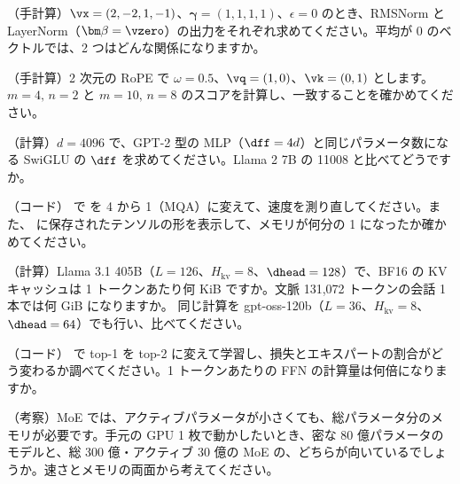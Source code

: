 \begin{exercises}
\item （手計算）$\vx=(2,-2,1,-1)$、$\bm\gamma=(1,1,1,1)$、$\epsilon=0$ のとき、RMSNorm と LayerNorm（$\bm\beta=\vzero$）の出力をそれぞれ求めてください。平均が 0 のベクトルでは、2 つはどんな関係になりますか。
\item （手計算）2 次元の RoPE で $\omega=0.5$、$\vq=(1,0)$、$\vk=(0,1)$ とします。$m=4,\,n=2$ と $m=10,\,n=8$ のスコアを計算し、一致することを確かめてください。
\item （計算）$d=4096$ で、GPT-2 型の MLP（$\dff=4d$）と同じパラメータ数になる SwiGLU の $\dff$ を求めてください。Llama 2 7B の 11008 と比べてどうですか。
\item （コード） で  を 4 から 1（MQA）に変えて、速度を測り直してください。また、 に保存されたテンソルの形を表示して、メモリが何分の 1 になったか確かめてください。
\item （計算）Llama 3.1 405B（$L=126$、$H_{\mathrm{kv}}=8$、$\dhead=128$）で、BF16 の KV キャッシュは 1 トークンあたり何 KiB ですか。文脈 131,072 トークンの会話 1 本では何 GiB になりますか。 同じ計算を gpt-oss-120b（$L=36$、$H_{\mathrm{kv}}=8$、$\dhead=64$）でも行い、比べてください。
\item （コード） で top-1 を top-2 に変えて学習し、損失とエキスパートの割合がどう変わるか調べてください。1 トークンあたりの FFN の計算量は何倍になりますか。
\item （考察）MoE では、アクティブパラメータが小さくても、総パラメータ分のメモリが必要です。手元の GPU 1 枚で動かしたいとき、密な 80 億パラメータのモデルと、総 300 億・アクティブ 30 億の MoE の、どちらが向いているでしょうか。速さとメモリの両面から考えてください。
\end{exercises}
